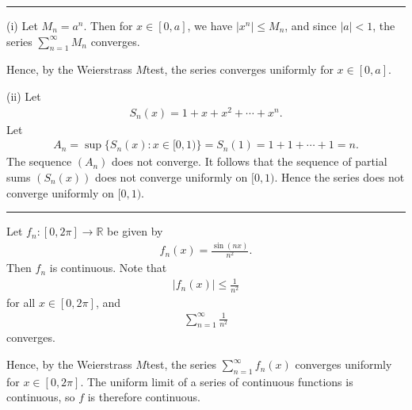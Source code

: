 \documentclass[letterpaper,10pt,english]{jupyterBook}
\begin{document}
\bigskip\hrule\bigskip


\sphinxAtStartPar
{\hyperref[\detokenize{Problems:id63}]{}}
(i) Let \(M_n =a^n\). Then for \(x\in [0,a]\), we have \(|x^n|\leq M_n\), and since \(|a|<1\), the series \(\sum_{n=1}^\infty M_n\) converges.

\sphinxAtStartPar
Hence, by the Weierstrass \(M\)\sphinxhyphen{}test, the series converges uniformly for \(x\in [0,a]\).

\sphinxAtStartPar
(ii) Let
\begin{equation*}
\begin{split}
S_n(x) = 1+x+x^2+\cdots + x^n.
\end{split}
\end{equation*}
\sphinxAtStartPar
Let
\begin{equation*}
\begin{split}
A_n = \sup \{ S_n (x) : x\in [0,1 ) \} = S_n(1) =1+1 + \cdots + 1 = n.
\end{split}
\end{equation*}
\sphinxAtStartPar
The sequence  \((A_n)\) does not converge. It follows that the sequence of partial sums \((S_n(x))\) does not converge uniformly on \([0,1)\). Hence the series does not converge uniformly on \([0,1)\).


\bigskip\hrule\bigskip


\sphinxAtStartPar
{\hyperref[\detokenize{Problems:id64}]{}}
Let \(f_n:[0,2\pi]\to\mathbb{R}\) be given by
\begin{equation*}
\begin{split}
f_n (x) = \frac{\sin (nx )}{n^2}.
\end{split}
\end{equation*}
\sphinxAtStartPar
Then \(f_n\) is continuous. Note that
\begin{equation*}
\begin{split}
|f_n (x )| \leq  \frac{1}{n^2}
\end{split}
\end{equation*}
\sphinxAtStartPar
for all \(x \in [0,2\pi]\), and
\begin{equation*}
\begin{split}
\sum_{n=1}^\infty \frac{1}{n^2}
\end{split}
\end{equation*}
\sphinxAtStartPar
converges.

\sphinxAtStartPar
Hence, by the Weierstrass \(M\)\sphinxhyphen{}test, the series \(\sum_{n=1}^\infty f_n (x )\) converges uniformly for \(x \in [0,2\pi]\). The uniform limit of a series of continuous functions is continuous, so \(f\) is therefore continuous.
\end{document}
